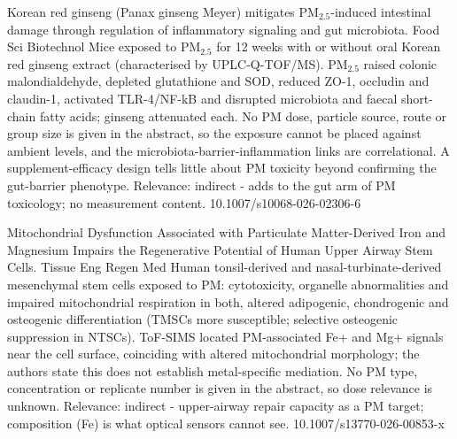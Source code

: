 \documentclass[10pt]{article}
\begin{document}
{Korean red ginseng (Panax ginseng Meyer) mitigates PM$_{2.5}$-induced intestinal damage through regulation of inflammatory signaling and gut microbiota.}
{Food Sci Biotechnol}
{Mice exposed to PM$_{2.5}$ for 12 weeks with or without oral Korean red ginseng extract (characterised by UPLC-Q-TOF/MS). PM$_{2.5}$ raised colonic malondialdehyde, depleted glutathione and SOD, reduced ZO-1, occludin and claudin-1, activated TLR-4/NF-kB and disrupted microbiota and faecal short-chain fatty acids; ginseng attenuated each. No PM dose, particle source, route or group size is given in the abstract, so the exposure cannot be placed against ambient levels, and the microbiota-barrier-inflammation links are correlational. A supplement-efficacy design tells little about PM toxicity beyond confirming the gut-barrier phenotype. Relevance: indirect - adds to the gut arm of PM toxicology; no measurement content.}
{10.1007/s10068-026-02306-6}

{Mitochondrial Dysfunction Associated with Particulate Matter-Derived Iron and Magnesium Impairs the Regenerative Potential of Human Upper Airway Stem Cells.}
{Tissue Eng Regen Med}
{Human tonsil-derived and nasal-turbinate-derived mesenchymal stem cells exposed to PM: cytotoxicity, organelle abnormalities and impaired mitochondrial respiration in both, altered adipogenic, chondrogenic and osteogenic differentiation (TMSCs more susceptible; selective osteogenic suppression in NTSCs). ToF-SIMS located PM-associated Fe+ and Mg+ signals near the cell surface, coinciding with altered mitochondrial morphology; the authors state this does not establish metal-specific mediation. No PM type, concentration or replicate number is given in the abstract, so dose relevance is unknown. Relevance: indirect - upper-airway repair capacity as a PM target; composition (Fe) is what optical sensors cannot see.}
{10.1007/s13770-026-00853-x}

\par{}\baselineskip{}\baselineskip
{}
\end{document}
